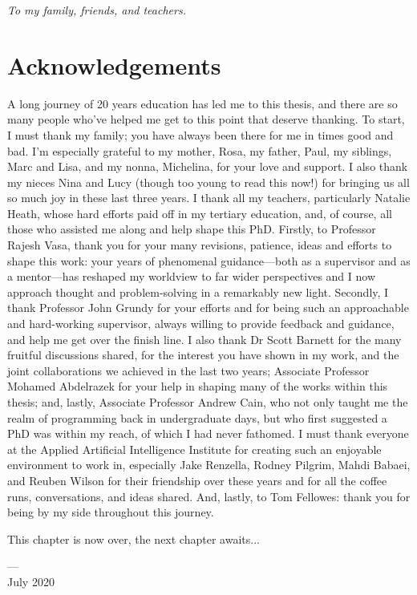 \cleardoublepage
\pagestyle{empty}
\begin{center}
  \vspace*{0.3\paperheight}
  \textit{To my family, friends, and teachers.}
\end{center}
\pagestyle{fancy}

\chapter*{Acknowledgements}

\vspace{-2\bigskipamount}

A long journey of 20 years education has led me to this thesis, and there are so many people who've helped me get to this point that deserve thanking. To start, I must thank my family; you have always been there for me in times good and bad. I'm especially grateful to my mother, Rosa, my father, Paul, my siblings, Marc and Lisa, and my nonna, Michelina, for your love and support. I also thank my nieces Nina and Lucy (though too young to read this now!) for bringing us all so much joy in these last three years. I thank all my teachers, particularly Natalie Heath, whose hard efforts paid off in my tertiary education, and, of course, all those who assisted me along and help shape this PhD. Firstly, to Professor Rajesh Vasa, thank you for your many revisions, patience, ideas and efforts to shape this work: your years of phenomenal guidance---both as a supervisor and as a mentor---has reshaped my worldview to far wider perspectives and I now approach thought and problem-solving in a remarkably new light. Secondly, I thank Professor John Grundy for your efforts and for being such an approachable and hard-working supervisor, always willing to provide feedback and guidance, and help me get over the finish line. I also thank Dr Scott Barnett for the many fruitful discussions shared, for the interest you have shown in my work, and the joint collaborations we achieved in the last two years; Associate Professor Mohamed Abdelrazek for your help in shaping many of the works within this thesis; and, lastly, Associate Professor Andrew Cain, who not only taught me the realm of programming back in undergraduate days, but who first suggested a PhD was within my reach, of which I had never fathomed. I must thank everyone at the Applied Artificial Intelligence Institute for creating such an enjoyable environment to work in, especially Jake Renzella, Rodney Pilgrim, Mahdi Babaei, and Reuben Wilson for their friendship over these years and for all the coffee runs, conversations, and ideas shared. And, lastly, to Tom Fellowes: thank you for being by my side throughout this journey. 

\bigskip
\noindent
This chapter is now over, the next chapter awaits...

\bigskip
\noindent
\hspace{\fill}
\parbox[b]{0.4\linewidth}{
\raggedleft
\small
--- \theauthor{}\\
July 2020
}